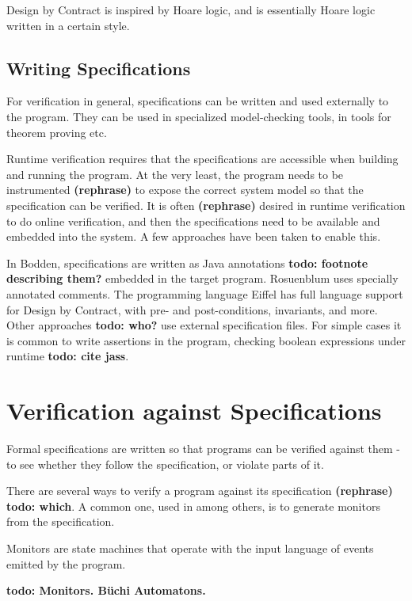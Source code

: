 \documentclass[a4paper,11pt]{kth-mag}
\newcommand{\todo}[1]{\textbf{todo: #1}}
\newcommand{\rephrase}{\textbf{(rephrase)} }
\begin{document}
Design by Contract is inspired by Hoare logic, and is essentially Hoare logic written in a certain style.

\subsection{Writing Specifications}

For verification in general, specifications can be written and used externally to the program. They
can be used in specialized model-checking tools, in tools for theorem proving etc.

Runtime verification requires that the specifications are accessible when building and running the program. At the very least, the program needs to be instrumented \rephrase to expose the
correct system model so that the specification can be verified. It is often \rephrase desired in runtime verification to do online verification, and then the specifications need to be available and
embedded into the system. A few approaches have been taken to enable this.

In Bodden, specifications are written as Java annotations \todo{footnote describing them?} embedded
in the target program. Rosuenblum \cite{rosenblum95practicalassertions} uses specially annotated
comments. The programming language Eiffel has full language support for Design by Contract, with
pre- and post-conditions, invariants, and more. Other approaches \todo{who?} use external specification files. For simple cases it is common to write assertions in the program, checking
boolean expressions under runtime \todo{cite jass}.


\section{Verification against Specifications} \label{section-verification}

Formal specifications are written so that programs can be verified against them - to see whether
they follow the specification, or violate parts of it.

There are several ways to verify a program against its specification \rephrase \todo{which}. A common
one, used in \cite{bauer06monitoring,bodden05efficientrv} among others, is to generate monitors
from the specification.

Monitors are state machines that operate with the input language of events emitted by the program.

\todo{Monitors. Büchi Automatons.}
\end{document}
